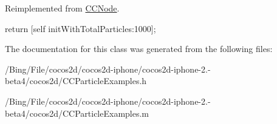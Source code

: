 Reimplemented from \hyperlink{class_c_c_node_ad789cad83aca65c130abd4452d1bc081}{C\-C\-Node}.


\begin{DoxyCode}
{
        return [self initWithTotalParticles:1000];
}
\end{DoxyCode}


The documentation for this class was generated from the following files\-:\begin{DoxyCompactItemize}
\item 
/\-Bing/\-File/cocos2d/cocos2d-\/iphone/cocos2d-\/iphone-\/2.-\/beta4/cocos2d/C\-C\-Particle\-Examples.\-h\item 
/\-Bing/\-File/cocos2d/cocos2d-\/iphone/cocos2d-\/iphone-\/2.-\/beta4/cocos2d/C\-C\-Particle\-Examples.\-m\end{DoxyCompactItemize}
